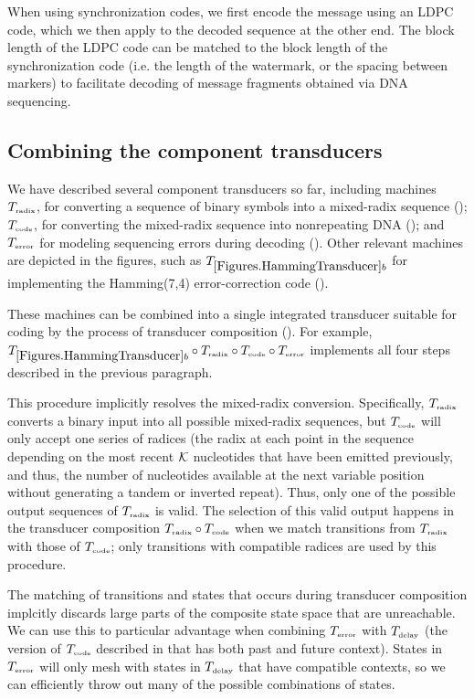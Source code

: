 \documentclass[english]{article}
\begin{document}
When using synchronization codes, we first encode the message using an LDPC code,
which we then apply to the decoded sequence at the other end.
The block length of the LDPC code can be matched to the block length of the synchronization code
(i.e. the length of the watermark, or the spacing between markers)
to facilitate decoding of message fragments obtained via DNA sequencing.

\subsection{Combining the component transducers}

We have described several component transducers so far,
including machines
$T_{\mbox{\tiny radix}}$, for converting a sequence of binary symbols
into a mixed-radix sequence ();
$T_{\mbox{\tiny code}}$, for converting the mixed-radix sequence into nonrepeating DNA
();
and $T_{\mbox{\tiny error}}$ for modeling sequencing errors during decoding
().
Other relevant machines are depicted in the figures,
such as $\hammingsevenfour$ for implementing the Hamming(7,4) error-correction code
().

These machines can be combined into a single integrated transducer suitable for coding
by the process of transducer composition ().
For example, $\hammingsevenfour \transcomp \transrad \transcomp \transcoder \transcomp \transerror$
implements all four steps described in the previous paragraph.

This procedure implicitly resolves the mixed-radix conversion.
Specifically, $T_{\mbox{\tiny radix}}$ converts a binary input into all possible mixed-radix sequences,
but $T_{\mbox{\tiny code}}$ will only accept one series of radices (the radix at each point in the sequence depending
on the most recent ${\cal K}$ nucleotides that have been emitted previously, and thus, the number of nucleotides available
at the next variable position without generating a tandem or inverted repeat).
Thus, only one of the possible output sequences of $T_{\mbox{\tiny radix}}$ is valid.
The selection of this valid output happens in the transducer composition $T_{\mbox{\tiny radix}} \circ T_{\mbox{\tiny code}}$
when we match transitions from $T_{\mbox{\tiny radix}}$ with those of $T_{\mbox{\tiny code}}$;
only transitions with compatible radices are used by this procedure.

The matching of transitions and states that occurs during transducer composition
implcitly discards large parts of the composite state space that are unreachable.
We can use this to particular advantage when combining $T_{\mbox{\tiny error}}$ with $T_{\mbox{\tiny delay}}$
(the version of $T_{\mbox{\tiny code}}$ described in  that has both past and future context).
States in $T_{\mbox{\tiny error}}$ will only mesh with states in $T_{\mbox{\tiny delay}}$ that have compatible contexts,
so we can efficiently throw out many of the possible combinations of states.
\end{document}
